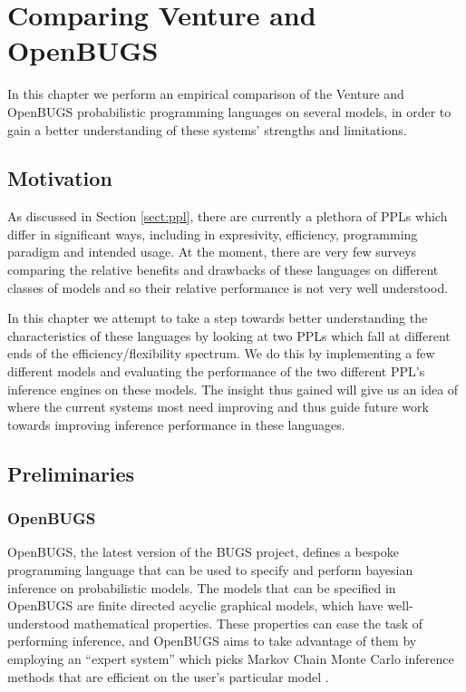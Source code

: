 \chapter{Comparing Venture and OpenBUGS}
\label{chap:perfComp}

In this chapter we perform an empirical comparison of the Venture and OpenBUGS probabilistic programming languages on several models, in order to gain a better understanding of these systems' strengths and limitations.

\section{Motivation}

As discussed in Section \ref{sect:ppl}, there are currently a plethora of PPLs which differ in significant ways, including in expresivity, efficiency, programming paradigm and intended usage.  At the moment, there are very few surveys comparing the relative benefits and drawbacks of these languages on different classes of models and so their relative performance is not very well understood. 

In this chapter we attempt to take a step towards better understanding the characteristics of these languages by looking at two PPLs which fall at different ends of the efficiency/flexibility spectrum. We do this by implementing a few different models and evaluating the performance of the two different PPL's inference engines on these models. The insight thus gained will give us an idea of where the current systems most need improving and thus guide future work towards improving inference performance in these languages.

\section{Preliminaries}
\subsection{OpenBUGS}

OpenBUGS, the latest version of the BUGS project, defines a bespoke programming language that can be used to specify and perform bayesian inference on probabilistic models. The models that can be specified in OpenBUGS are finite directed acyclic graphical models, which have well-understood mathematical properties. These properties can ease the task of performing inference, and OpenBUGS aims to take advantage of them by employing an ``expert system'' which picks Markov Chain Monte Carlo inference methods that are efficient on the user's particular model \cite{bugsOverview}.

